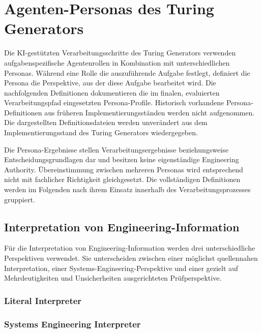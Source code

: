 \section{Agenten-Personas des Turing Generators}
\label{app:persona_definitions}
Die KI-gestützten Verarbeitungsschritte des Turing Generators verwenden
aufgabenspezifische Agentenrollen in Kombination mit unterschiedlichen
Personas. Während eine Rolle die auszuführende Aufgabe festlegt, definiert
die Persona die Perspektive, aus der diese Aufgabe bearbeitet wird.
Die nachfolgenden Definitionen dokumentieren die im finalen, evaluierten
Verarbeitungspfad eingesetzten Persona-Profile. Historisch vorhandene
Persona-Definitionen aus früheren Implementierungsständen werden nicht
aufgenommen. Die dargestellten Definitionsdateien werden unverändert aus dem
Implementierungsstand des Turing Generators wiedergegeben.

Die Persona-Ergebnisse stellen Verarbeitungsergebnisse beziehungsweise
Entscheidungsgrundlagen dar und besitzen keine eigenständige Engineering
Authority. Übereinstimmung zwischen mehreren Personas wird entsprechend
nicht mit fachlicher Richtigkeit gleichgesetzt. Die vollständigen
Definitionen werden im Folgenden nach ihrem Einsatz innerhalb des
Verarbeitungsprozesses gruppiert.

\subsection{Interpretation von Engineering-Information}
\label{app:personas_interpretation}

Für die Interpretation von Engineering-Information werden drei
unterschiedliche Perspektiven verwendet. Sie unterscheiden zwischen einer
möglichst quellennahen Interpretation, einer Systems-Engineering-Perspektive
und einer gezielt auf Mehrdeutigkeiten und Unsicherheiten ausgerichteten
Prüfperspektive.

\subsubsection*{Literal Interpreter}


\subsubsection*{Systems Engineering Interpreter}


